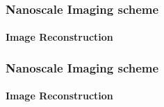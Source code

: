 \documentclass[mathserif,18pt,xcolor=table,c]{beamer}
\begin{document}
  \begin{frame}[t]
    \frametitle{Nanoscale Imaging scheme}
    \framesubtitle{Image Reconstruction}
    \begin{center}
      \begin{figure}[t!]
        \centering \vspace*{-.5cm}
        \def\svgwidth{.55\linewidth}
        
        \label{fig:sim}
      \end{figure}
    \end{center}
  \end{frame}
  \begin{frame}[t]
    \frametitle{Nanoscale Imaging scheme}
    \framesubtitle{Image Reconstruction}
    \begin{center}
      \begin{figure}[t!]
        \centering
        \vspace*{-1cm}
        \label{fig:simulation1}
      \end{figure}
    \end{center}
  \end{frame}
\end{document}
